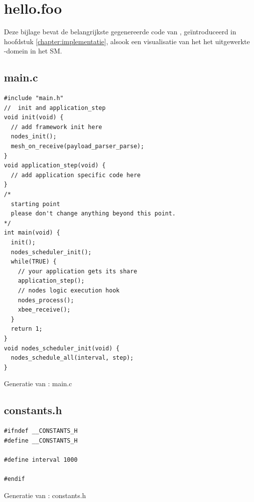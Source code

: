 
\chapter{hello.foo}
\label{appendix:hello-srcs}

Deze bijlage bevat de belangrijkste gegenereerde code van ,
ge\"introduceerd in hoofdstuk \ref{chapter:implementatie}, alsook een
visualisatie van het het uitgewerkte -domein in het SM.

\section{main.c}
\vspace{-5mm}
\begin{listing}[H]
  \begin{verbatim}
#include "main.h"
//  init and application_step
void init(void) {
  // add framework init here
  nodes_init();
  mesh_on_receive(payload_parser_parse);
}
void application_step(void) {
  // add application specific code here
}
/*
  starting point
  please don't change anything beyond this point.
*/
int main(void) {
  init();
  nodes_scheduler_init();
  while(TRUE) {
    // your application gets its share
    application_step();
    // nodes logic execution hook
    nodes_process();
    xbee_receive();
  }
  return 1;
}
void nodes_scheduler_init(void) {
  nodes_schedule_all(interval, step);
}
  \end{verbatim}
  \vspace{-5mm}
  \caption{Generatie van : main.c}
\end{listing}

\section{constants.h}
\vspace{-5mm}
\begin{listing}[H]
  \begin{verbatim}
#ifndef __CONSTANTS_H
#define __CONSTANTS_H

#define interval 1000

#endif
  \end{verbatim}
  \vspace{-5mm}
  \caption{Generatie van : constants.h}
\end{listing}


